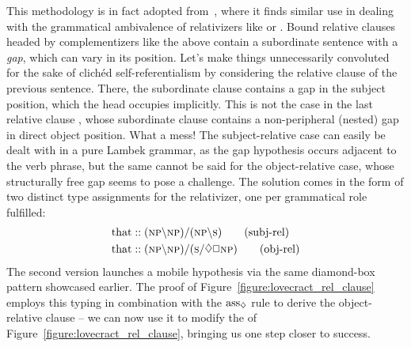 This methodology is in fact adopted from~\citet{moortgat1999constants}, where it finds similar use in dealing with the grammatical ambivalence of relativizers like  or .
Bound relative clauses headed by complementizers like the above contain a subordinate sentence with a \textit{gap}, which can vary in its position.
Let's make things unnecessarily convoluted for the sake of clich{\'e}d self-referentialism by considering the relative clause  of the previous sentence.
There, the subordinate clause  contains a gap in the subject position, which the head  occupies implicitly.
This is not the case in the last relative clause , whose subordinate clause  contains a non-peripheral (nested) gap in direct object position.
What a mess! 
The subject-relative case can easily be dealt with in a pure Lambek grammar, as the gap hypothesis occurs adjacent to the verb phrase, but
the same cannot be said for the object-relative case, whose structurally free gap seems to pose a challenge.
The solution comes in the form of two distinct type assignments for the relativizer, one per grammatical role fulfilled:
\begin{align*}
	\w{that} &:: (\np\divleft\np)\divright(\np\divleft\s) \tag{subj-rel}\\
	\w{that} &:: (\np\divleft\np)\divright(\s\divright\diamond\Box \np ) \tag{obj-rel}
\end{align*}
The second version launches a mobile \np[s] hypothesis via the same diamond-box pattern showcased earlier.
The proof of Figure~\ref{figure:lovecract_rel_clause} employs this typing in combination with the $\rulestyle{ass}_{\diamond}$ rule to derive the object-relative clause  -- we can now use it to modify the  of Figure~\ref{figure:lovecract_rel_clause}, bringing us one step closer to success.

